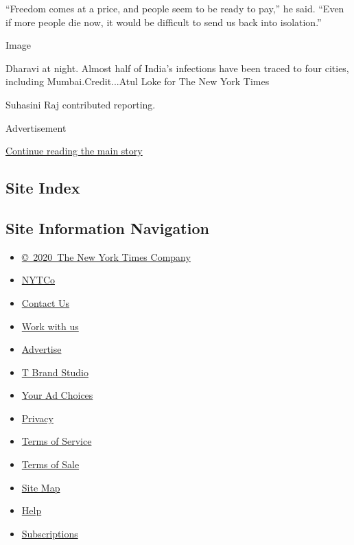 ``Freedom comes at a price, and people seem to be ready to pay,'' he
said. ``Even if more people die now, it would be difficult to send us
back into isolation.''

Image

Dharavi at night. Almost half of India's infections have been traced to
four cities, including Mumbai.Credit...Atul Loke for The New York Times

Suhasini Raj contributed reporting.

Advertisement

\protect\hyperlink{after-bottom}{Continue reading the main story}

\hypertarget{site-index}{%
\subsection{Site Index}\label{site-index}}

\hypertarget{site-information-navigation}{%
\subsection{Site Information
Navigation}\label{site-information-navigation}}

\begin{itemize}
\tightlist
\item
  \href{https://help.nytimes.com/hc/en-us/articles/115014792127-Copyright-notice}{©~2020~The
  New York Times Company}
\end{itemize}

\begin{itemize}
\tightlist
\item
  \href{https://www.nytco.com/}{NYTCo}
\item
  \href{https://help.nytimes.com/hc/en-us/articles/115015385887-Contact-Us}{Contact
  Us}
\item
  \href{https://www.nytco.com/careers/}{Work with us}
\item
  \href{https://nytmediakit.com/}{Advertise}
\item
  \href{http://www.tbrandstudio.com/}{T Brand Studio}
\item
  \href{https://www.nytimes.com/privacy/cookie-policy\#how-do-i-manage-trackers}{Your
  Ad Choices}
\item
  \href{https://www.nytimes.com/privacy}{Privacy}
\item
  \href{https://help.nytimes.com/hc/en-us/articles/115014893428-Terms-of-service}{Terms
  of Service}
\item
  \href{https://help.nytimes.com/hc/en-us/articles/115014893968-Terms-of-sale}{Terms
  of Sale}
\item
  \href{https://spiderbites.nytimes.com}{Site Map}
\item
  \href{https://help.nytimes.com/hc/en-us}{Help}
\item
  \href{https://www.nytimes.com/subscription?campaignId=37WXW}{Subscriptions}
\end{itemize}
